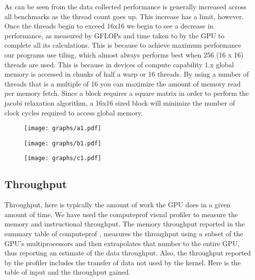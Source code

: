 \documentclass[10pt]{article}
\begin{document}
\begin{multicols}{2}
    As can be seen from the data collected performance is generally increased across all benchmarks as the thread count goes up.
    This increase has a limit, however.
    Once the threads begin to exceed 16x16 we begin to see a decrease in performance, as measured by GFLOPs and time taken to by the GPU to complete all its calculations.
    This is because to achieve maximum performance our programs use tiling, which almost always performs best when 256 (16 x 16) threads are used.
    This is because in devices of compute capability 1.x global memory is accessed in chunks of half a warp or 16 threads.
    By using a number of threads that is a multiple of 16 you can maximize the amount of memory read per memory fetch.
    Since a block requires a square matrix in order to perform the jacobi relaxation algorithm, a 16x16 sized block will minimize the number of clock cycles required to access global memory.


    \begin{figure*}
        \centering
        \texttt{[image: graphs/a1.pdf]}
        \caption{}
        \label{fig:time_taken1}
    \end{figure*}
    
    \begin{figure*}
        \centering
        \texttt{[image: graphs/b1.pdf]}
        \caption{}
        \label{fig:time_taken2}
    \end{figure*}

    \begin{figure*}
        \centering
        \texttt{[image: graphs/c1.pdf]}
        \caption{}
        \label{fig:time_taken3}
    \end{figure*}

    \subsection{Throughput}
    Throughput, here is typically the amount of work the GPU does in a given amount of time.
    We have used the computeprof visual profiler to measure the memory and instructional throughput.
    The memory throughput reported in the summary table of computeprof ,  measures  the throughput using a subset of the GPU’s multiprocessors and then extrapolates that number to the entire GPU, thus reporting an estimate of the data throughput.
    Also, the throughput reported by the profiler includes the transfer of data not used by the kernel.
    Here is the table of input and the throughput gained.


\end{multicols}
\end{document}
